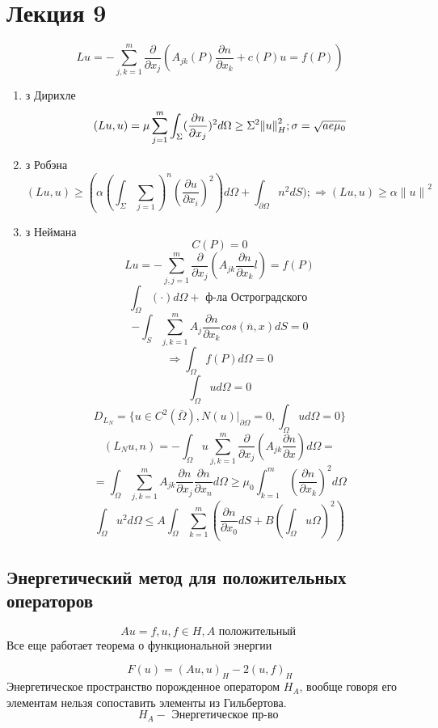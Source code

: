\section{Лекция 9}

\[ Lu = - \sum_{j,k=1}^{m} \frac{\partial }{\partial  x_j} (A_{jk}(P)\frac{\partial n}{\partial x_k} + c(P)u = f(P)) \label{8_1_1}\]



\begin{enumerate}
	\item з Дирихле
	\[ (Lu, u) = \mu \sum_{j=1}^{m} \int_{\Sigma}^{}(\frac{\partial n}{\partial x_j})^2 d\Omega \geq \Sigma^2 {\|u\|}^2_H; \sigma = \sqrt{\\ae \mu_0}\]
	\item з Робэна $\label{8_3}$
	\[ (Lu, u) \geq (\alpha {(\int_{\Sigma}^{} \sum_{j=1})}^{n}(\frac{\partial u}{\partial x_i})^2) d\Omega + \int_{\partial \Omega}^{}n^2 dS) ; \Rightarrow (Lu, u) \geq \alpha {\|u\|}^2 \]
	\item з Неймана
	\[ C(P) = 0 \]
	\[ Lu = -\sum_{j,j =1}^{m}\frac{\partial}{\partial  x_j}(A_{jk} \frac{\partial n}{\partial x_k}l) = f(P) \]
	\[ \int_{\Omega}^{}(\cdot) d \Omega + \textrm{ ф-ла Остроградского } \]
	\[ -\int_{S}^{} \sum_{j,k = 1}^{m} A_j \frac{\partial n}{\partial x_k} cos( \overline{n}, x) dS = 0 \]
	\[ \Rightarrow \int_{\Omega}^{}f(P) d \Omega = 0 \]
	\[ \int_{\Omega}^{} u d\Omega = 0 \]
	\[ D_{L_N} = \{ u \in C^2 ( \overline{\Omega}), N(u)|_{\partial \Omega} = 0, \int_{\Omega}^{}u d \Omega = 0 \} \]
	\[ (L_N u, n) = -\int_{\Omega}^{} u \sum_{j,k=1}^{m} \frac{\partial }{\partial x_j}(A_{jk} \frac{\partial n}{\partial x}) d\Omega = \]
	\[ = \int_{\Omega}^{} \sum_{j,k=1}^{m} A_{jk} \frac{\partial n}{\partial x_j} \frac{\partial n}{\partial  x_n} d \Omega \geq \mu_0 \int_{k=1}^{m} (\frac{\partial n}{\partial x_k})^2 d\Omega \]
	\[ \int_{\Omega}^{} u^2 d\Omega \leq A \int_{\Omega}^{} \sum_{k = 1}^{m} (\frac{\partial  n}{\partial x_0}dS + B (\int_{\Omega}^{} u \Omega)^2)\]
	
\end{enumerate}

\subsection{Энергетический метод для положительных операторов}

\[ Au = f, u, f \in H, A \textrm{ положительный } \]
Все еще работает теорема о функциональной энергии

\[ F(u) = (Au, u)_H - 2(u, f)_H \label{8_2_2}\]
Энергетическое пространство порожденное оператором $ H_A $, вообще говоря его элементам нельзя сопоставить элементы из Гильбертова.
\[ H_A - \textrm{  Энергетическое пр-во } \]

